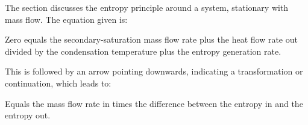 The section discusses the entropy principle around a system, stationary with mass flow. The equation given is:

Zero equals the secondary-saturation mass flow rate plus the heat flow rate out divided by the condensation temperature plus the entropy generation rate.

This is followed by an arrow pointing downwards, indicating a transformation or continuation, which leads to:

Equals the mass flow rate in times the difference between the entropy in and the entropy out.